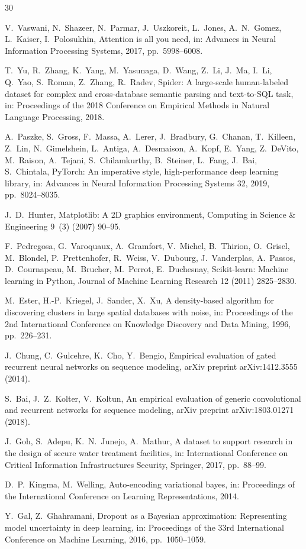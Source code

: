 \documentclass[preprint,12pt, a4paper]{elsarticle}
\begin{document}
\begin{thebibliography}{30}

V.~Vaswani, N.~Shazeer, N.~Parmar, J.~Uszkoreit, L.~Jones, A.~N.~Gomez, L.~Kaiser, I.~Polosukhin,
Attention is all you need,
in: Advances in Neural Information Processing Systems, 2017, pp.~5998--6008.

T.~Yu, R.~Zhang, K.~Yang, M.~Yasunaga, D.~Wang, Z.~Li, J.~Ma, I.~Li, Q.~Yao, S.~Roman, Z.~Zhang, R.~Radev,
Spider: A large-scale human-labeled dataset for complex and cross-database semantic parsing and text-to-SQL task,
in: Proceedings of the 2018 Conference on Empirical Methods in Natural Language Processing, 2018.

A.~Paszke, S.~Gross, F.~Massa, A.~Lerer, J.~Bradbury, G.~Chanan, T.~Killeen, Z.~Lin, N.~Gimelshein, L.~Antiga, A.~Desmaison, A.~Kopf, E.~Yang, Z.~DeVito, M.~Raison, A.~Tejani, S.~Chilamkurthy, B.~Steiner, L.~Fang, J.~Bai, S.~Chintala,
PyTorch: An imperative style, high-performance deep learning library,
in: Advances in Neural Information Processing Systems 32, 2019, pp.~8024--8035.

J.~D.~Hunter,
Matplotlib: A 2D graphics environment,
Computing in Science \& Engineering 9~(3) (2007) 90--95.

F.~Pedregosa, G.~Varoquaux, A.~Gramfort, V.~Michel, B.~Thirion, O.~Grisel, M.~Blondel, P.~Prettenhofer, R.~Weiss, V.~Dubourg, J.~Vanderplas, A.~Passos, D.~Cournapeau, M.~Brucher, M.~Perrot, E.~Duchesnay,
Scikit-learn: Machine learning in Python,
Journal of Machine Learning Research 12 (2011) 2825--2830.

M.~Ester, H.-P.~Kriegel, J.~Sander, X.~Xu,
A density-based algorithm for discovering clusters in large spatial databases with noise,
in: Proceedings of the 2nd International Conference on Knowledge Discovery and Data Mining, 1996, pp.~226--231.

J.~Chung, C.~Gulcehre, K.~Cho, Y.~Bengio,
Empirical evaluation of gated recurrent neural networks on sequence modeling,
arXiv preprint arXiv:1412.3555 (2014).

S.~Bai, J.~Z.~Kolter, V.~Koltun,
An empirical evaluation of generic convolutional and recurrent networks for sequence modeling,
arXiv preprint arXiv:1803.01271 (2018).

J.~Goh, S.~Adepu, K.~N.~Junejo, A.~Mathur,
A dataset to support research in the design of secure water treatment facilities,
in: International Conference on Critical Information Infrastructures Security, Springer, 2017, pp.~88--99.

D.~P.~Kingma, M.~Welling,
Auto-encoding variational bayes,
in: Proceedings of the International Conference on Learning Representations, 2014.

Y.~Gal, Z.~Ghahramani,
Dropout as a Bayesian approximation: Representing model uncertainty in deep learning,
in: Proceedings of the 33rd International Conference on Machine Learning, 2016, pp.~1050--1059.

\end{thebibliography}
\end{document}
